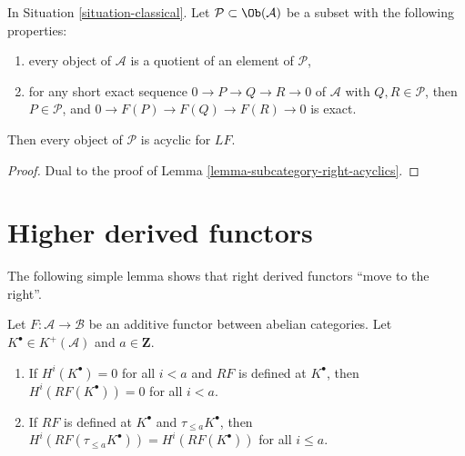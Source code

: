 \begin{lemma}
\label{lemma-subcategory-left-acyclics}
In
Situation \ref{situation-classical}.
Let $\mathcal{P} \subset \Ob(\mathcal{A})$ be a subset with the
following properties:
\begin{enumerate}
\item every object of $\mathcal{A}$ is a quotient of an element of
$\mathcal{P}$,
\item for any short exact sequence $0 \to P \to Q \to R \to 0$ of
$\mathcal{A}$ with $Q, R \in \mathcal{P}$, then $P \in \mathcal{P}$,
and $0 \to F(P) \to F(Q) \to F(R) \to 0$ is exact.
\end{enumerate}
Then every object of $\mathcal{P}$ is acyclic for $LF$.
\end{lemma}

\begin{proof}
Dual to the proof of
Lemma \ref{lemma-subcategory-right-acyclics}.
\end{proof}







\section{Higher derived functors}
\label{section-higher-derived}

\noindent
The following simple lemma shows that right derived functors
``move to the right''.

\begin{lemma}
\label{lemma-negative-vanishing}
Let $F : \mathcal{A} \to \mathcal{B}$ be an additive functor
between abelian categories. Let $K^\bullet \in K^{+}(\mathcal{A})$
and $a \in \mathbf{Z}$.
\begin{enumerate}
\item If $H^i(K^\bullet) = 0$ for all $i < a$ and $RF$ is defined at
$K^\bullet$, then $H^i(RF(K^\bullet)) = 0$ for all $i < a$.
\item If $RF$ is defined at $K^\bullet$ and $\tau_{\leq a}K^\bullet$,
then $H^i(RF(\tau_{\leq a}K^\bullet)) = H^i(RF(K^\bullet))$
for all $i \leq a$.
\end{enumerate}
\end{lemma}

